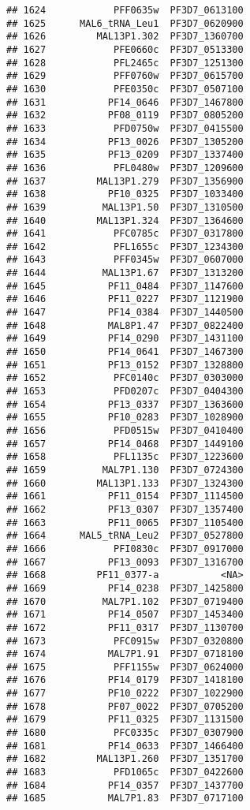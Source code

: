 \documentclass{article}\usepackage[]{graphicx}\usepackage[]{color}
\makeatletter
\newenvironment{kframe}{%
 \def\at@end@of@kframe{}%
 \ifinner\ifhmode%
  \def\at@end@of@kframe{\end{minipage}}%
  \begin{minipage}{\columnwidth}%
 \fi\fi%
 \def\FrameCommand##1{\hskip\@totalleftmargin \hskip-\fboxsep
 \colorbox{shadecolor}{##1}\hskip-\fboxsep
     \hskip-\linewidth \hskip-\@totalleftmargin \hskip\columnwidth}%
 \MakeFramed {\advance\hsize-\width
   \@totalleftmargin\z@ \linewidth\hsize
   \@setminipage}}%
 {\par\unskip\endMakeFramed%
 \at@end@of@kframe}
\newenvironment{knitrout}{}{} %
\makeatother
\begin{document}
\begin{knitrout}
\begin{kframe}
\begin{verbatim}
## 1624            PFF0635w  PF3D7_0613100
## 1625      MAL6_tRNA_Leu1  PF3D7_0620900
## 1626         MAL13P1.302  PF3D7_1360700
## 1627            PFE0660c  PF3D7_0513300
## 1628            PFL2465c  PF3D7_1251300
## 1629            PFF0760w  PF3D7_0615700
## 1630            PFE0350c  PF3D7_0507100
## 1631           PF14_0646  PF3D7_1467800
## 1632           PF08_0119  PF3D7_0805200
## 1633            PFD0750w  PF3D7_0415500
## 1634           PF13_0026  PF3D7_1305200
## 1635           PF13_0209  PF3D7_1337400
## 1636            PFL0480w  PF3D7_1209600
## 1637         MAL13P1.279  PF3D7_1356900
## 1638           PF10_0325  PF3D7_1033400
## 1639          MAL13P1.50  PF3D7_1310500
## 1640         MAL13P1.324  PF3D7_1364600
## 1641            PFC0785c  PF3D7_0317800
## 1642            PFL1655c  PF3D7_1234300
## 1643            PFF0345w  PF3D7_0607000
## 1644          MAL13P1.67  PF3D7_1313200
## 1645           PF11_0484  PF3D7_1147600
## 1646           PF11_0227  PF3D7_1121900
## 1647           PF14_0384  PF3D7_1440500
## 1648           MAL8P1.47  PF3D7_0822400
## 1649           PF14_0290  PF3D7_1431100
## 1650           PF14_0641  PF3D7_1467300
## 1651           PF13_0152  PF3D7_1328800
## 1652            PFC0140c  PF3D7_0303000
## 1653            PFD0207c  PF3D7_0404300
## 1654           PF13_0337  PF3D7_1363600
## 1655           PF10_0283  PF3D7_1028900
## 1656            PFD0515w  PF3D7_0410400
## 1657           PF14_0468  PF3D7_1449100
## 1658            PFL1135c  PF3D7_1223600
## 1659          MAL7P1.130  PF3D7_0724300
## 1660         MAL13P1.133  PF3D7_1324300
## 1661           PF11_0154  PF3D7_1114500
## 1662           PF13_0307  PF3D7_1357400
## 1663           PF11_0065  PF3D7_1105400
## 1664      MAL5_tRNA_Leu2  PF3D7_0527800
## 1666            PFI0830c  PF3D7_0917000
## 1667           PF13_0093  PF3D7_1316700
## 1668         PF11_0377-a           <NA>
## 1669           PF14_0238  PF3D7_1425800
## 1670          MAL7P1.102  PF3D7_0719400
## 1671           PF14_0507  PF3D7_1453400
## 1672           PF11_0317  PF3D7_1130700
## 1673            PFC0915w  PF3D7_0320800
## 1674           MAL7P1.91  PF3D7_0718100
## 1675            PFF1155w  PF3D7_0624000
## 1676           PF14_0179  PF3D7_1418100
## 1677           PF10_0222  PF3D7_1022900
## 1678           PF07_0022  PF3D7_0705200
## 1679           PF11_0325  PF3D7_1131500
## 1680            PFC0335c  PF3D7_0307900
## 1681           PF14_0633  PF3D7_1466400
## 1682         MAL13P1.260  PF3D7_1351700
## 1683            PFD1065c  PF3D7_0422600
## 1684           PF14_0357  PF3D7_1437700
## 1685           MAL7P1.83  PF3D7_0717100

\end{verbatim}
\end{kframe}
\end{knitrout}
\end{document}
